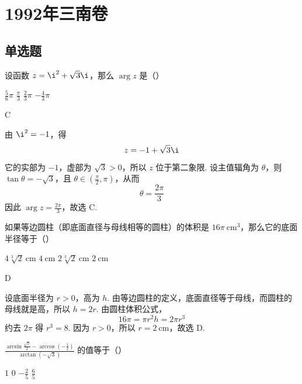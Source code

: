 \documentclass[UTF8,a4paper,oneside,11pt]{ctexbook}
\begin{document}
\mainmatter

\chapter{1992年三南卷}
\section{单选题}

\begin{problem}
设函数 \(z=\i^2+\sqrt{3}\i\)，那么 \(\arg z\) 是（\quad）

\choices
    {\(\frac{5}{6}\pi\)}
    {\(\frac{\pi}{3}\)}
    {\(\frac{2}{3}\pi\)}
    {\(-\frac{4}{3}\pi\)}
\end{problem}

\begin{answer}
C
\end{answer}

\begin{solution}
由 \(\i^2=-1\)，得
\[
z=-1+\sqrt{3}\i
\]
它的实部为 \(-1\)，虚部为 \(\sqrt{3}>0\)，所以 \(z\) 位于第二象限. 设主值辐角为 \(\theta\)，则 \(\tan\theta=-\sqrt{3}\)，且 \(\theta\in(\frac{\pi}{2},\pi)\)，从而
\[
\theta=\frac{2\pi}{3}
\]
因此 \(\arg z=\frac{2\pi}{3}\)，故选 C.
\end{solution}

\begin{problem}
如果等边圆柱（即底面直径与母线相等的圆柱）的体积是 \(16\pi\mathrm{~cm}^3\)，那么它的底面半径等于（\quad）

\choices
    {\(4\sqrt[3]{2}\mathrm{~cm}\)}
    {\(4\mathrm{~cm}\)}
    {\(2\sqrt[3]{2}\mathrm{~cm}\)}
    {\(2\mathrm{~cm}\)}
\end{problem}

\begin{answer}
D
\end{answer}

\begin{solution}
设底面半径为 \(r>0\)，高为 \(h\). 由等边圆柱的定义，底面直径等于母线，而圆柱的母线就是高，所以 \(h=2r\). 由圆柱体积公式，
\[
16\pi=\pi r^2h=2\pi r^3
\]
约去 \(2\pi\) 得 \(r^3=8\). 因为 \(r>0\)，所以 \(r=2\mathrm{~cm}\)，故选 D.
\end{solution}

\begin{problem}
\(\frac{\arcsin \frac{\sqrt{3}}{2}-\arccos \left( -\frac{1}{2} \right)}{\arctan \left( -\sqrt{3} \right)}\) 的值等于（\quad）

\choices
    {\(1\)}
    {\(0\)}
    {\(-\frac{2}{5}\)}
    {\(\frac{6}{5}\)}
\end{problem}
\end{document}
